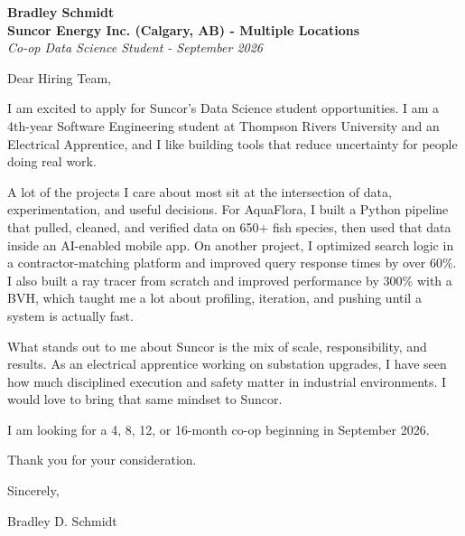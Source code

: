 \documentclass[11pt]{article}
\begin{document}
\textbf{Bradley Schmidt}\\
\vspace{0.5em}
\textbf{Suncor Energy Inc. (Calgary, AB) - Multiple Locations}\\
\textit{Co-op Data Science Student - September 2026}

Dear Hiring Team,

\par

I am excited to apply for Suncor's Data Science student opportunities. I am a 4th-year Software Engineering student at Thompson Rivers University and an Electrical Apprentice, and I like building tools that reduce uncertainty for people doing real work.

\par

A lot of the projects I care about most sit at the intersection of data, experimentation, and useful decisions. For AquaFlora, I built a Python pipeline that pulled, cleaned, and verified data on 650+ fish species, then used that data inside an AI-enabled mobile app. On another project, I optimized search logic in a contractor-matching platform and improved query response times by over 60\%. I also built a ray tracer from scratch and improved performance by 300\% with a BVH, which taught me a lot about profiling, iteration, and pushing until a system is actually fast.

\par

What stands out to me about Suncor is the mix of scale, responsibility, and results. As an electrical apprentice working on substation upgrades, I have seen how much disciplined execution and safety matter in industrial environments. I would love to bring that same mindset to Suncor.

\par

I am looking for a 4, 8, 12, or 16-month co-op beginning in September 2026.

\par

Thank you for your consideration.

\par

Sincerely,

\par

Bradley D. Schmidt
\end{document}
